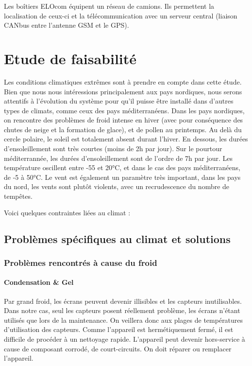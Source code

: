 Les boîtiers ELOcom équipent un réseau de camions. Ils permettent la localisation de ceux-ci et la télécommunication avec un serveur central (liaison CANbus entre l’antenne GSM et le GPS).

\section{Etude de faisabilité}

Les conditions climatiques extrêmes sont à prendre en compte dans cette étude. Bien que nous nous intéressions principalement aux pays nordiques, nous serons attentifs à l’évolution du système pour qu’il puisse être installé dans d'autres types de climats, comme ceux des pays méditerranéens.
Dans les pays nordiques, on rencontre des problèmes de froid intense en hiver (avec pour conséquence des chutes de neige et la formation de glace), et de pollen au printemps. Au delà du cercle polaire, le soleil est totalement absent durant l'hiver. En dessous, les durées d'ensoleillement sont très courtes (moins de 2h par jour). Sur le pourtour méditerrannée, les durées d'ensoleillement sont de l'ordre de 7h par jour.
Les température oscillent entre -55 et 20°C, et dans le cas des pays méditerranéens, de -5 à 50°C.
Le vent est également un paramètre très important, dans les pays du nord, les vents sont plutôt violents, avec un recrudescence du nombre de tempêtes.

Voici quelques contraintes liées au climat :

\subsection{Problèmes spécifiques au climat et solutions}

\subsubsection{Problèmes rencontrés à cause du froid}

\paragraph{Condensation \&  Gel}

Par grand froid, les écrans peuvent devenir illisibles et les capteurs inutilisables. Dans notre cas, seul les capteurs posent réellement problème, les écrans n'étant utilisés que lors de la maintenance. On veillera donc aux plages de températures d'utilisation des capteurs.
Comme l’appareil est hermétiquement fermé, il est difficile de procéder à un nettoyage rapide. L’appareil peut devenir hors-service à cause de composant corrodé, de court-circuits. On doit réparer ou remplacer l’appareil.

